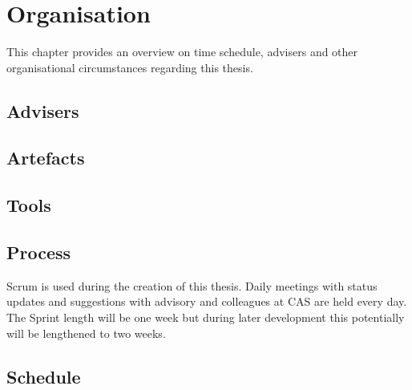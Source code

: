 \chapter{Organisation}
\label{ch:Organisation}

This chapter provides an overview on time schedule, advisers and other organisational circumstances regarding this thesis.

\section{Advisers}
\label{sec:Organisation:Advisers}

\section{Artefacts}
\label{sec:Organisation:Artefacts}

\section{Tools}
\label{sec:Organisation:Tools}

\section{Process}
\label{sec:Organisation:Process}

Scrum is used during the creation of this thesis. Daily meetings with status updates and suggestions with advisory and colleagues at CAS are held every day. The Sprint length will be one week but during later development this potentially will be lengthened to two weeks.

\section{Schedule}
\label{sec:Organisation:Schedule}

